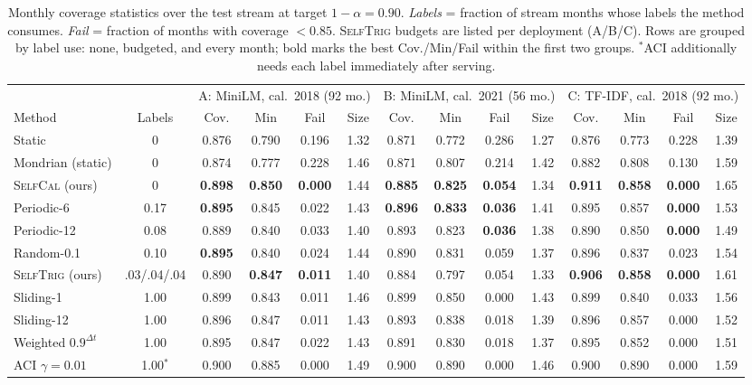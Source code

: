 \documentclass[conference]{IEEEtran}
\newcommand{\selfcal}{\textsc{SelfCal}}
\newcommand{\selftrig}{\textsc{SelfTrig}}
\begin{document}
\begin{table}[t]
\caption{Monthly coverage statistics over the test stream at target $1-\alpha=0.90$. \emph{Labels} = fraction of stream months whose labels the method consumes. \emph{Fail} = fraction of months with coverage $<0.85$. \selftrig{} budgets are listed per deployment (A/B/C). Rows are grouped by label use: none, budgeted, and every month; bold marks the best Cov./Min/Fail within the first two groups. $^{*}$ACI additionally needs each label immediately after serving.}
\label{tab:main}
\centering\footnotesize
\setlength{\tabcolsep}{3.4pt}
\begin{tabular}{@{}l c cccc @{\hspace{6pt}} cccc @{\hspace{6pt}} cccc@{}}
\toprule
& & \multicolumn{4}{c}{A: MiniLM, cal.\ 2018 (92 mo.)} & \multicolumn{4}{c}{B: MiniLM, cal.\ 2021 (56 mo.)} & \multicolumn{4}{c}{C: TF-IDF, cal.\ 2018 (92 mo.)}\\
\cmidrule(lr){3-6}\cmidrule(lr){7-10}\cmidrule(lr){11-14}
Method & Labels & Cov. & Min & Fail & Size & Cov. & Min & Fail & Size & Cov. & Min & Fail & Size\\
\midrule
Static & 0 & 0.876 & 0.790 & 0.196 & 1.32 & 0.871 & 0.772 & 0.286 & 1.27 & 0.876 & 0.773 & 0.228 & 1.39\\
Mondrian (static) & 0 & 0.874 & 0.777 & 0.228 & 1.46 & 0.871 & 0.807 & 0.214 & 1.42 & 0.882 & 0.808 & 0.130 & 1.59\\
\selfcal{} (ours) & 0 & \textbf{0.898} & \textbf{0.850} & \textbf{0.000} & 1.44 & \textbf{0.885} & \textbf{0.825} & \textbf{0.054} & 1.34 & \textbf{0.911} & \textbf{0.858} & \textbf{0.000} & 1.65\\
\midrule
Periodic-6 & 0.17 & \textbf{0.895} & 0.845 & 0.022 & 1.43 & \textbf{0.896} & \textbf{0.833} & \textbf{0.036} & 1.41 & 0.895 & 0.857 & \textbf{0.000} & 1.53\\
Periodic-12 & 0.08 & 0.889 & 0.840 & 0.033 & 1.40 & 0.893 & 0.823 & \textbf{0.036} & 1.38 & 0.890 & 0.850 & \textbf{0.000} & 1.49\\
Random-0.1 & 0.10 & \textbf{0.895} & 0.840 & 0.024 & 1.44 & 0.890 & 0.831 & 0.059 & 1.37 & 0.896 & 0.837 & 0.023 & 1.54\\
\selftrig{} (ours) & .03/.04/.04 & 0.890 & \textbf{0.847} & \textbf{0.011} & 1.40 & 0.884 & 0.797 & 0.054 & 1.33 & \textbf{0.906} & \textbf{0.858} & \textbf{0.000} & 1.61\\
\midrule
Sliding-1 & 1.00 & 0.899 & 0.843 & 0.011 & 1.46 & 0.899 & 0.850 & 0.000 & 1.43 & 0.899 & 0.840 & 0.033 & 1.56\\
Sliding-12 & 1.00 & 0.896 & 0.847 & 0.011 & 1.43 & 0.893 & 0.838 & 0.018 & 1.39 & 0.896 & 0.857 & 0.000 & 1.52\\
Weighted $0.9^{\Delta t}$ & 1.00 & 0.895 & 0.847 & 0.022 & 1.43 & 0.891 & 0.830 & 0.018 & 1.37 & 0.895 & 0.852 & 0.000 & 1.51\\
ACI $\gamma{=}0.01$ & 1.00$^{*}$ & 0.900 & 0.885 & 0.000 & 1.49 & 0.900 & 0.890 & 0.000 & 1.46 & 0.900 & 0.890 & 0.000 & 1.59\\
\bottomrule
\end{tabular}
\end{table}
\end{document}
